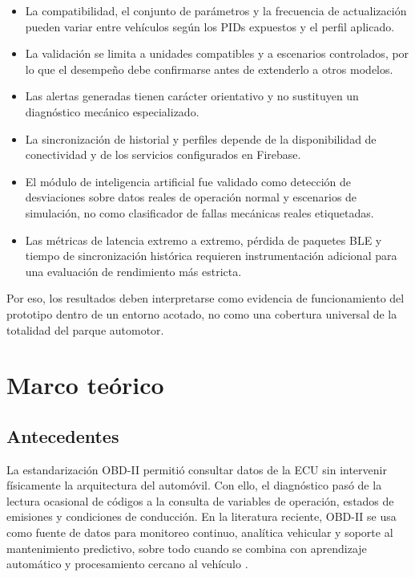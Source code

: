 \documentclass[12pt,letterpaper]{report}
\begin{document}
\begin{itemize}
    \item La compatibilidad, el conjunto de parámetros y la frecuencia de actualización pueden variar entre vehículos según los PIDs expuestos y el perfil aplicado.
    \item La validación se limita a unidades compatibles y a escenarios controlados, por lo que el desempeño debe confirmarse antes de extenderlo a otros modelos.
    \item Las alertas generadas tienen carácter orientativo y no sustituyen un diagnóstico mecánico especializado.
    \item La sincronización de historial y perfiles depende de la disponibilidad de conectividad y de los servicios configurados en Firebase.
    \item El módulo de inteligencia artificial fue validado como detección de desviaciones sobre datos reales de operación normal y escenarios de simulación, no como clasificador de fallas mecánicas reales etiquetadas.
    \item Las métricas de latencia extremo a extremo, pérdida de paquetes BLE y tiempo de sincronización histórica requieren instrumentación adicional para una evaluación de rendimiento más estricta.
\end{itemize}

Por eso, los resultados deben interpretarse como evidencia de funcionamiento del prototipo dentro de un entorno acotado, no como una cobertura universal de la totalidad del parque automotor.

\chapter{Marco teórico}

\section{Antecedentes}

La estandarización OBD-II permitió consultar datos de la ECU sin intervenir físicamente la arquitectura del automóvil. Con ello, el diagnóstico pasó de la lectura ocasional de códigos a la consulta de variables de operación, estados de emisiones y condiciones de conducción. En la literatura reciente, OBD-II se usa como fuente de datos para monitoreo continuo, analítica vehicular y soporte al mantenimiento predictivo, sobre todo cuando se combina con aprendizaje automático y procesamiento cercano al vehículo \cite{sae2022_j1978_obdii_scan_tool,michailidis2025_obdii_review,mahale2025_review_predictive_maintenance}.
\end{document}
